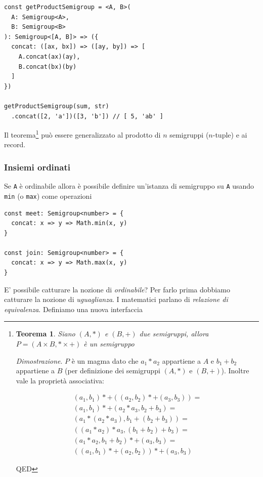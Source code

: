 \documentclass[12pt]{article}
\newtheorem{theorem}{Teorema}
\begin{document}
\begin{verbatim}
const getProductSemigroup = <A, B>(
  A: Semigroup<A>,
  B: Semigroup<B>
): Semigroup<[A, B]> => ({
  concat: ([ax, bx]) => ([ay, by]) => [
    A.concat(ax)(ay),
    B.concat(bx)(by)
  ]
})

getProductSemigroup(sum, str)
  .concat([2, 'a'])([3, 'b']) // [ 5, 'ab' ]
\end{verbatim}

Il teorema\footnote{
\begin{theorem}
Siano $(A, *)$ e $(B, +)$ due semigruppi, allora $P = (A \times B, * \times +)$ è un semigruppo
\end{theorem}

\emph{Dimostrazione}. $P$ è un magma dato che $a_1 * a_2$ appartiene a $A$ e $b_1 + b_2$ appartiene a $B$ (per definizione dei semigruppi $(A, *)$ e $(B, +)$).
Inoltre vale la proprietà associativa:

\begin{eqnarray}
(a_1, b_1) *+ ((a_2, b_2) *+ (a_3, b_3)) = \\
(a_1, b_1) *+ (a_2 * a_3, b_2 + b_3) = \\
(a_1 * (a_2 * a_3), b_1 + (b_2 + b_3)) = \\
((a_1 * a_2) * a_3, (b_1 + b_2) + b_3) = \\
(a_1 * a_2, b_1 + b_2) *+ (a_3, b_3) = \\
((a_1, b_1) *+ (a_2, b_2)) *+ (a_3, b_3)
\end{eqnarray}

QED

} può essere generalizzato al prodotto di $n$ semigruppi ($n$-tuple) e ai record.

\subsubsection{Insiemi ordinati}

Se \texttt{A} è ordinabile allora è possibile definire un'istanza di semigruppo su \texttt{A} usando \texttt{min} (o \texttt{max}) come operazioni

\begin{verbatim}
const meet: Semigroup<number> = {
  concat: x => y => Math.min(x, y)
}

const join: Semigroup<number> = {
  concat: x => y => Math.max(x, y)
}
\end{verbatim}

E' possibile catturare la nozione di \emph{ordinabile}? Per farlo prima dobbiamo catturare la nozione di \emph{uguaglianza}.
I matematici parlano di \emph{relazione di equivalenza}.
Definiamo una nuova interfaccia
\end{document}
